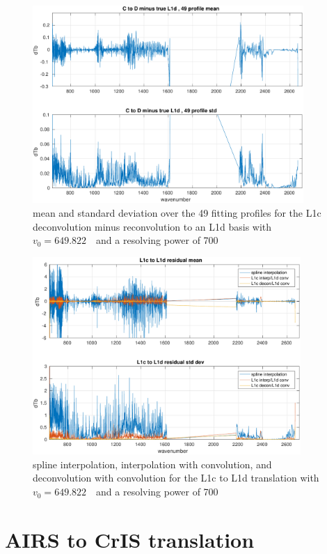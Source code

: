 \documentclass[11pt]{article}
\begin{document}
\begin{figure} %
  \centering
  \includegraphics[height=7.5cm]{figures/CtoD700s_diff.pdf}
  \caption{mean and standard deviation over the 49 fitting profiles
    for the L1c deconvolution minus reconvolution to an L1d basis
    with $v_0=649.822$~\wn\ and a resolving power of 700}
  \label{L1d700s}
\end{figure}

\begin{figure} %
  \centering
  \includegraphics[height=7.5cm]{figures/CtoD_interp_diff.pdf}
  \caption{spline interpolation, interpolation with convolution, 
    and deconvolution with convolution for the {\airs} L1c to L1d
    translation with $v_0=649.822$~\wn\ and a resolving power of 700}
  \label{interpL1d}
\end{figure}

\FloatBarrier
\section{AIRS to CrIS translation}
\label{airs2cris}
\end{document}
